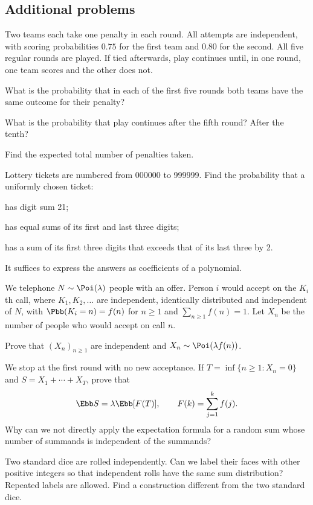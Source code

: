 \subsection*{Additional problems}
\begin{problempencil}
Two teams each take one penalty in each round. All attempts are independent,
with scoring probabilities $0.75$ for the first team and $0.80$ for the second.
All five regular rounds are played. If tied afterwards, play continues until,
in one round, one team scores and the other does not.
\begin{enumeratea}
  \item What is the probability that in each of the first five rounds both teams
  have the same outcome for their penalty?
  \item What is the probability that play continues after the fifth round? After the tenth?
  \item Find the expected total number of penalties taken.
\end{enumeratea}
\end{problempencil}
\begin{problem}
Lottery tickets are numbered from 000000 to 999999. Find the probability that a uniformly chosen ticket:
\begin{enumeratea}
  \item has digit sum 21;
  \item has equal sums of its first and last three digits;
  \item has a sum of its first three digits that exceeds that of its last three by 2.
\end{enumeratea}
It suffices to express the answers as coefficients of a polynomial.
\end{problem}
\begin{problempencil}
We telephone $N\sim\Poi(\lambda)$ people with an offer. Person $i$ would accept
on the $K_i$th call, where $K_1,K_2,\ldots$ are independent, identically distributed
and independent of $N$, with $\Pbb(K_i=n)=f(n)$ for $n\ge1$ and
$\sum_{n\ge1}f(n)=1$. Let $X_n$ be the number of people who would accept on call $n$.
\begin{enumeratea}
  \item Prove that $(X_n)_{n\ge1}$ are independent and $X_n\sim\Poi(\lambda f(n))$.
  \item We stop at the first round with no new acceptance. If
  $T=\inf\{n\ge1:X_n=0\}$ and $S=X_1+\cdots+X_T$, prove that
  \[ \Ebb S=\lambda\Ebb[F(T)],\qquad F(k)=\sum_{j=1}^k f(j). \]
  Why can we not directly apply the expectation formula for a random sum whose
  number of summands is independent of the summands?
\end{enumeratea}
\end{problempencil}
\begin{problempencil}
Two standard dice are rolled independently. Can we label their faces with other
positive integers so that independent rolls have the same sum distribution?
Repeated labels are allowed. Find a construction different from the two standard dice.
\end{problempencil}
